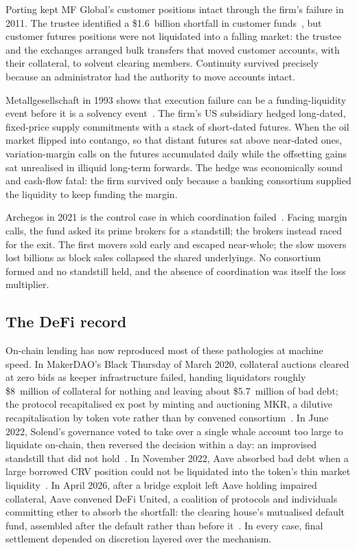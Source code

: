 \documentclass[11pt,a4paper]{article}
\begin{document}
Porting kept MF Global's customer positions intact through the firm's failure in 2011. The trustee identified a \$1.6~billion shortfall in customer funds~\cite{mfglobal}, but customer futures positions were not liquidated into a falling market: the trustee and the exchanges arranged bulk transfers that moved customer accounts, with their collateral, to solvent clearing members. Continuity survived precisely because an administrator had the authority to move accounts intact.

Metallgesellschaft in 1993 shows that execution failure can be a funding-liquidity event before it is a solvency event~\cite{metallgesellschaft}. The firm's US subsidiary hedged long-dated, fixed-price supply commitments with a stack of short-dated futures. When the oil market flipped into contango, so that distant futures sat above near-dated ones, variation-margin calls on the futures accumulated daily while the offsetting gains sat unrealised in illiquid long-term forwards. The hedge was economically sound and cash-flow fatal: the firm survived only because a banking consortium supplied the liquidity to keep funding the margin.

Archegos in 2021 is the control case in which coordination failed~\cite{archegos}. Facing margin calls, the fund asked its prime brokers for a standstill; the brokers instead raced for the exit. The first movers sold early and escaped near-whole; the slow movers lost billions as block sales collapsed the shared underlyings. No consortium formed and no standstill held, and the absence of coordination was itself the loss multiplier.

\subsection{The DeFi record}

On-chain lending has now reproduced most of these pathologies at machine speed. In MakerDAO's Black Thursday of March 2020, collateral auctions cleared at zero bids as keeper infrastructure failed, handing liquidators roughly \$8~million of collateral for nothing and leaving about \$5.7~million of bad debt; the protocol recapitalised ex post by minting and auctioning MKR, a dilutive recapitalisation by token vote rather than by convened consortium~\cite{makerdao}. In June 2022, Solend's governance voted to take over a single whale account too large to liquidate on-chain, then reversed the decision within a day: an improvised standstill that did not hold~\cite{solend}. In November 2022, Aave absorbed bad debt when a large borrowed CRV position could not be liquidated into the token's thin market liquidity~\cite{aavecrv}. In April 2026, after a bridge exploit left Aave holding impaired collateral, Aave convened DeFi United, a coalition of protocols and individuals committing ether to absorb the shortfall: the clearing house's mutualised default fund, assembled after the default rather than before it~\cite{united}. In every case, final settlement depended on discretion layered over the mechanism.
\end{document}
